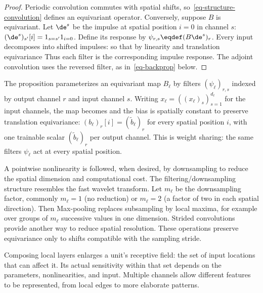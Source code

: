 \begin{proof}
	Periodic convolution commutes with spatial shifts, so~\eqref{eq-structure-convolution} defines an equivariant operator.
	Conversely, suppose $B$ is equivariant. Let $\de^{s}$ be the impulse at spatial position $i=0$ in channel $s$: $(\de^{s})_{s'}[i] = 1_{s=s'} 1_{i=0}$. Define its response by $\psi_{r,s} \eqdef (B \de^s)_r$. Every input decomposes into shifted impulses:
	so that by linearity and translation equivariance
	Thus each filter is the corresponding impulse response. The adjoint convolution uses the reversed filter, as in~\eqref{eq-backprop} below.
\end{proof}

The proposition parameterizes an equivariant map $B_\ell$ by filters $(\psi_\ell)_{r,s}$ indexed by output channel $r$ and input channel $s$. Writing $x_\ell = ( (x_{\ell})_s )_{s=1}^{d_\ell}$ for the input channels, the map becomes
and the bias is spatially constant to preserve translation equivariance: $(b_\ell)_r[i]=(\tilde b_\ell)_r$ for every spatial position $i$, with one trainable scalar $(\tilde b_\ell)_r$ per output channel.
%
This is weight sharing: the same filters $\psi_\ell$ act at every spatial position.

A pointwise nonlinearity is followed, when desired, by downsampling to reduce the spatial dimension and computational cost. The filtering/downsampling structure resembles the fast wavelet transform. Let $m_\ell$ be the downsampling factor, commonly $m_\ell=1$ (no reduction) or $m_\ell=2$ (a factor of two in each spatial direction). Then
Max-pooling replaces subsampling by local maxima, for example over groups of $m_\ell$ successive values in one dimension. Strided convolutions provide another way to reduce spatial resolution. These operations preserve equivariance only to shifts compatible with the sampling stride.

Composing local layers enlarges a unit's receptive field: the set of input locations that can affect it. Its actual sensitivity within that set depends on the parameters, nonlinearities, and input. Multiple channels allow different features to be represented, from local edges to more elaborate patterns.

